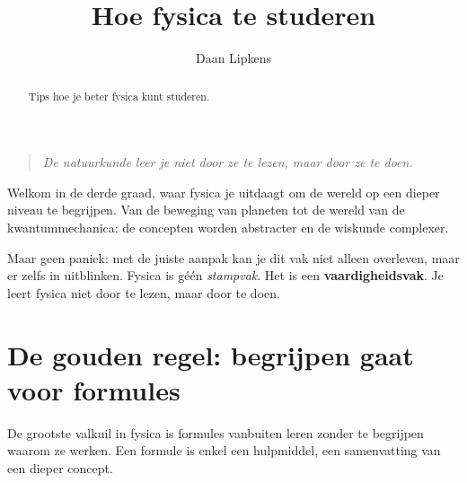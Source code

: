 \documentclass{ximera}
\title{Hoe fysica te studeren}
\author{Daan Lipkens}
\begin{document}
\begin{abstract}
    Tips hoe je beter fysica kunt studeren.
\end{abstract}
\maketitle

\begin{quote}
  \textit{De natuurkunde leer je niet door ze te lezen, maar door ze te doen.}
\end{quote}

Welkom in de derde graad, waar fysica je uitdaagt om de wereld op een dieper niveau te begrijpen.  
Van de beweging van planeten tot de wereld van de kwantummechanica: de concepten worden abstracter en de wiskunde complexer.  

Maar geen paniek: met de juiste aanpak kan je dit vak niet alleen overleven, maar er zelfs in uitblinken.  
Fysica is géén \textit{stampvak}. Het is een \textbf{vaardigheidsvak}.  
Je leert fysica niet door te lezen, maar door te doen.


\section*{De gouden regel: begrijpen gaat voor formules}


\begin{remark}[] %
De grootste valkuil in fysica is formules vanbuiten leren zonder te begrijpen waarom ze werken.  
Een formule is enkel een hulpmiddel, een samenvatting van een dieper concept.
\end{remark}
\end{document}
